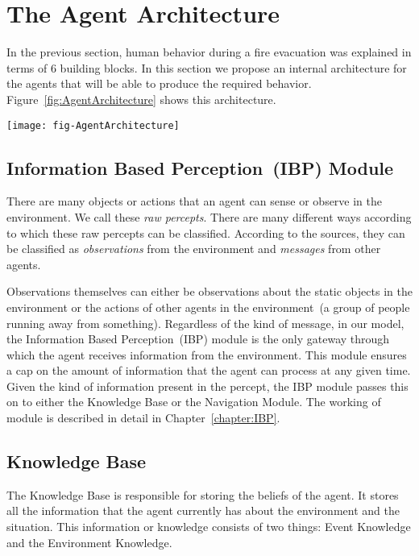 \section{The Agent Architecture}
\label{IBEVAC:AgentArchitecture}
In the previous section, human behavior during a fire evacuation was explained in terms of 6 building blocks. In this section we propose an internal architecture for the agents that will be able to produce the required behavior. Figure~\ref{fig:AgentArchitecture} shows this architecture.

\begin{sidewaysfigure}[!htb]
\centering
\texttt{[image: fig-AgentArchitecture]}
\caption[The Agent Architecture]{An illustrated representation of the agent architecture described in Sect.~\ref{IBEVAC:AgentArchitecture}}
\label{fig:AgentArchitecture}
\end{sidewaysfigure}

\subsection{Information Based Perception~(IBP) Module}
\label{IBEVAC:IBPModule}
There are many objects or actions that an agent can sense or observe in the environment. We call these \emph{raw percepts}. There are many different ways according to which these raw percepts can be classified. According to the sources, they can be classified as \emph{observations} from the environment and \emph{messages} from other agents.

Observations themselves can either be observations about the static objects in the environment or the actions of other agents in the environment~(a group of people running away from something). Regardless of the kind of message, in our model, the Information Based Perception~(IBP) module is the only gateway through which the agent receives information from the environment. This module ensures a cap on the amount of information that the agent can process at any given time. Given the kind of information present in the percept, the IBP module passes this on to either the Knowledge Base or the Navigation Module. The working of module is described in detail in Chapter~\ref{chapter:IBP}.

\subsection{Knowledge Base}
\label{IBEVAC:KnowledgeBase}
The Knowledge Base is responsible for storing the beliefs of the agent. It stores all the information that the agent currently has about the environment and the situation. This information or knowledge consists of two things: Event Knowledge and the Environment Knowledge.

